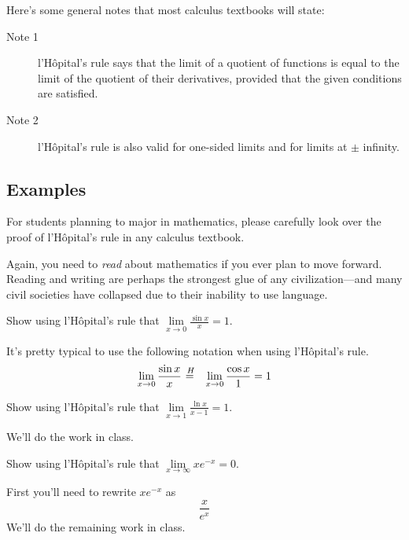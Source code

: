 \documentclass[12pt,addpoints, answers, fleqn]{exam}
\newcommand*\Heq{\ensuremath{\overset{\kern2pt H}{=}}}
\begin{document}
Here's some general notes that most calculus textbooks will state:
\begin{description}
\item[Note 1] l'H\^{o}pital's rule  says that the limit of a quotient of functions is equal to the limit of the quotient of their derivatives, provided that the given conditions are satisfied.
\item[Note 2] l'H\^{o}pital's rule is also valid for one-sided limits and for limits at $\pm$ infinity.
\end{description}

\subsection{Examples}
\begin{questions}

\question For students planning to major in mathematics, please carefully look over the proof of l'H\^{o}pital's rule in any calculus textbook.
\begin{solution}
Again, you need to \emph{read} about mathematics if you ever plan to move forward. Reading and writing are perhaps the strongest glue of any civilization---and many civil societies have collapsed due to their inability to use language.
\end{solution}


\question Show using  l'H\^{o}pital's rule that $\displaystyle \mathop {\lim }\limits_{ x \to 0} \frac{\sin x}{x} = 1$.
\begin{solution}
It's pretty typical to use the following notation when using l'H\^{o}pital's rule.
\begin{eqnarray*}
 \lim_{x \to 0}  \frac{\sin x}{x} &\Heq&  \lim_{x \to 0} \frac{\cos x }{1} = 1
\end{eqnarray*}
\end{solution}


\question Show using  l'H\^{o}pital's rule that $\displaystyle \mathop {\lim }\limits_{ x \to 1} \frac{\ln x}{x-1} = 1$.
\begin{solution}
We'll do the work in class.
\end{solution}


\question Show using  l'H\^{o}pital's rule that $\displaystyle \mathop {\lim }\limits_{ x \to \infty} x e^{-x} = 0$.
\begin{solution}
First you'll need to rewrite $x e^{-x}$ as
\[
\frac{x}{e^x}
\]
We'll do the remaining work in class.
\end{solution}



\end{questions}
\end{document}

